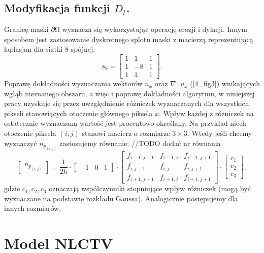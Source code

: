 \documentclass[12pt, twoside, openany]{report}
\theoremstyle{definition}
\begin{document}
\subsection{Modyfikacja funkcji $D_t$.}
\label{ssec:modDtForCrim}
Granicę maski $\partial \mathrm{\Omega }$ wyznacza się wykorzystując operację erozji i dylacji. Innym sposobem jest zastosowanie dyskretnego splotu maski z macierzą reprezentującą laplasjan dla siatki 8-spójnej: 
\begin{equation}
s_8 = 
\left[ \begin{array}{ccc}
1 & 1 & 1 \\ 
1 & -8 & 1 \\ 
1 & 1 & 1 \end{array}
\right]
\label{LAPLASJAN}
.
\end{equation}
Poprawę dokładności wyznaczania wektorów $n_x$ oraz $\nabla^\bot u_x$ (\autoref{4_fig3}) wnikających wgłąb nieznanego obszaru, a więc i poprawę dokładności algorytmu, w niniejszej pracy uzyskuje się przez uwzględnienie różniczek wyznaczanych dla wszystkich pikseli stanowiących otoczenie głównego piksela $x$. Wpływ każdej z różniczek na ostatecznie wyznaczaną wartość jest procentowo określany.
Na przykład niech otoczenie piksela $(i, j)$ stanowi macierz o rozmiarze $3 \times 3$. Wtedy jeśli chcemy wyznaczyć $n_{p_{(i,j)}}$ zastosujemy równanie: //TODO dodać nr równania
\[
\begin{bmatrix}
n_{p_{(i,j)}}
\end{bmatrix}
=\frac{1}{2h}
\cdot
\begin{bmatrix}
-1 & 0 & 1
\end{bmatrix}
\cdot
\begin{bmatrix}
f_{i-1, j-1} & f_{i-1, j} & f_{i-1, j+1}\\ 
f_{i,   j-1} & f_{i,   j} & f_{i,   j+1}\\
f_{i+1, j-1} & f_{i+1, j} & f_{i+1, j+1}
\end{bmatrix}
\cdot
\begin{bmatrix}
c_1\\ 
c_2\\
c_3
\end{bmatrix},
\]
gdzie $c_1, c_2, c_3$ oznaczają współczynniki stopniujące wpływ różniczek (mogą być wyznaczane na podstawie rozkładu Gaussa). Analogicznie postępujemy dla innych rozmiarów.
\section{Model NLCTV}
\label{sec:smodNLCTV}
\end{document}
